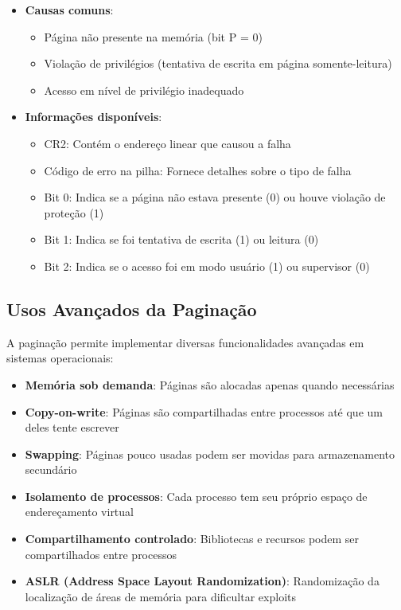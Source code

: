 \begin{itemize}
    \item \textbf{Causas comuns}:
    \begin{itemize}
        \item Página não presente na memória (bit P = 0)
        \item Violação de privilégios (tentativa de escrita em página somente-leitura)
        \item Acesso em nível de privilégio inadequado
    \end{itemize}

    \item \textbf{Informações disponíveis}:
    \begin{itemize}
        \item CR2: Contém o endereço linear que causou a falha
        \item Código de erro na pilha: Fornece detalhes sobre o tipo de falha
        \item Bit 0: Indica se a página não estava presente (0) ou houve violação de proteção (1)
        \item Bit 1: Indica se foi tentativa de escrita (1) ou leitura (0)
        \item Bit 2: Indica se o acesso foi em modo usuário (1) ou supervisor (0)
    \end{itemize}
\end{itemize}

\subsection{Usos Avançados da Paginação}
\label{subsec:usos_avancados}

A paginação permite implementar diversas funcionalidades avançadas em sistemas operacionais:

\begin{itemize}
    \item \textbf{Memória sob demanda}: Páginas são alocadas apenas quando necessárias

    \item \textbf{Copy-on-write}: Páginas são compartilhadas entre processos até que um deles tente escrever

    \item \textbf{Swapping}: Páginas pouco usadas podem ser movidas para armazenamento secundário

    \item \textbf{Isolamento de processos}: Cada processo tem seu próprio espaço de endereçamento virtual

    \item \textbf{Compartilhamento controlado}: Bibliotecas e recursos podem ser compartilhados entre processos

    \item \textbf{ASLR (Address Space Layout Randomization)}: Randomização da localização de áreas de memória para dificultar exploits
\end{itemize}

